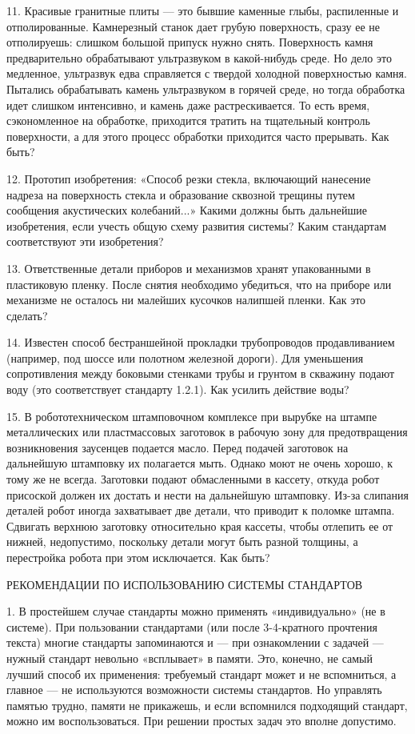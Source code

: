 11. Красивые гранитные плиты —  это бывшие каменные глыбы, распиленные
и отполированные. Камнерезный станок дает грубую поверхность, сразу ее
не отполируешь: слишком большой припуск нужно снять. Поверхность камня
предварительно  обрабатывают  ультразвуком  в какой-нибудь  среде.  Но
дело  это медленное,  ультразвук едва  справляется с  твердой холодной
поверхностью  камня.  Пытались   обрабатывать  камень  ультразвуком  в
горячей среде,  но тогда обработка  идет слишком интенсивно,  и камень
даже  растрескивается.  То  есть время,  сэкономленное  на  обработке,
приходится  тратить на  тщательный контроль  поверхности, а  для этого
процесс обработки приходится часто прерывать. Как быть?

12. Прототип  изобретения: «Способ резки стекла,  включающий нанесение
надреза  на поверхность  стекла и  образование сквозной  трещины путем
сообщения  акустических колебаний...»  Какими  должны быть  дальнейшие
изобретения,  если   учесть  общую   схему  развития   системы?  Каким
стандартам соответствуют эти изобретения?

13. Ответственные  детали приборов и механизмов  хранят упакованными в
пластиковую пленку. После снятия  необходимо убедиться, что на приборе
или механизме  не осталось ни  малейших кусочков налипшей  пленки. Как
это сделать?

14.    Известен   способ    бестраншейной   прокладки    трубопроводов
продавливанием (например, под шоссе или полотном железной дороги). Для
уменьшения  сопротивления между  боковыми стенками  трубы и  грунтом в
скважину подают воду (это  соответствует стандарту 1.2.1). Как усилить
действие воды?

15.  В   робототехническом  штамповочном  комплексе  при   вырубке  на
штампе металлических  или пластмассовых  заготовок в рабочую  зону для
предотвращения возникновения  заусенцев подается масло.  Перед подачей
заготовок на дальнейшую  штамповку их полагается мыть.  Однако моют не
очень  хорошо, к  тому  же не  всегда.  Заготовки подают  обмасленными
в  кассету,  откуда робот  присоской  должен  их  достать и  нести  на
дальнейшую штамповку. Из-за слипания  деталей робот иногда захватывает
две детали, что приводит к  поломке штампа. Сдвигать верхнюю заготовку
относительно края  кассеты, чтобы отлепить ее  от нижней, недопустимо,
поскольку детали могут  быть разной толщины, а  перестройка робота при
этом исключается. Как быть?


РЕКОМЕНДАЦИИ ПО ИСПОЛЬЗОВАНИЮ СИСТЕМЫ СТАНДАРТОВ

1. В  простейшем случае стандарты можно  применять «индивидуально» (не
в  системе).  При  пользовании  стандартами  (или  после  3-4-кратного
прочтения текста) многие стандарты запоминаются и — при ознакомлении с
задачей — нужный стандарт невольно «всплывает» в памяти. Это, конечно,
не  самый лучший  способ  их применения:  требуемый  стандарт может  и
не  вспомниться,  а  главное  — не  используются  возможности  системы
стандартов. Но управлять  памятью трудно, памяти не  прикажешь, и если
вспомнился подходящий стандарт, можно  им воспользоваться. При решении
простых задач это вполне допустимо.

